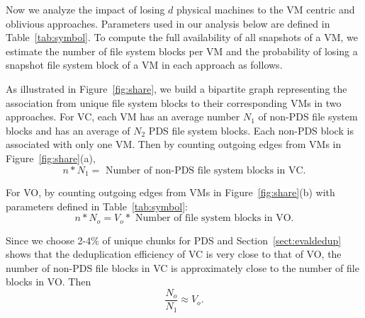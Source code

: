 Now we  analyze  the impact of losing $d$ physical machines 
to the VM centric and oblivious approaches.  
Parameters used in our analysis below are defined in Table~\ref{tab:symbol}. 
To compute the full availability of all snapshots of a VM, we estimate
the number of file system blocks per VM and the probability of losing a snapshot file system 
block of a VM in each approach as follows.

As illustrated in Figure~\ref{fig:share}, we build a bipartite graph representing the
association from unique file system blocks to their corresponding VMs in two 
approaches. 
For VC, each VM has an average number $N_1$ of non-PDS file system blocks
and  has  an average of  $N_2$ PDS file system blocks. 
Each non-PDS block is associated with only one VM.
Then by counting outgoing edges from VMs in Figure~\ref{fig:share}(a),
\[
n* N_1   = \mbox{ Number of non-PDS file system blocks in VC.} 
\]

For VO, 
by counting outgoing edges from VMs in Figure~\ref{fig:share}(b) with parameters defined in
Table~\ref{tab:symbol}: 
\[
n *N_o   =  V_o *\mbox{ Number of file system blocks in VO.} 
\]

Since we choose 2-4\% of unique chunks for PDS
and Section~\ref{sect:evaldedup} 
shows that the deduplication efficiency of VC is very close to that of VO,
the number of non-PDS file blocks in VC is approximately close to the number of file blocks in VO.
Then
\[
\frac{N_o}{N_1} \approx  V_o.
\]

